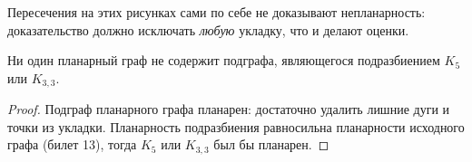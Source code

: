 Пересечения на этих рисунках сами по себе не доказывают непланарность:
доказательство должно исключать \emph{любую} укладку, что и делают оценки.
\begin{cor}
Ни один планарный граф не содержит подграфа, являющегося подразбиением
\(K_5\) или \(K_{3,3}\).
\end{cor}
\begin{proof}
Подграф планарного графа планарен: достаточно удалить лишние дуги и точки
из укладки. Планарность подразбиения равносильна планарности исходного
графа (билет 13), тогда \(K_5\) или \(K_{3,3}\) был бы планарен.
\end{proof}
